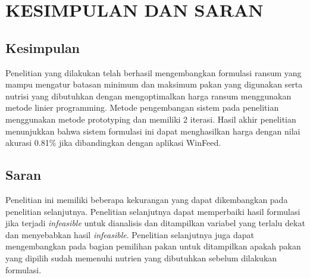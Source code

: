 \section*{KESIMPULAN DAN SARAN}
\subsection*{Kesimpulan}
Penelitian yang dilakukan telah berhasil mengembangkan formulasi ransum yang mampu mengatur batasan minimum dan maksimum pakan yang digunakan serta nutrisi yang dibutuhkan dengan mengoptimalkan harga ransum menggunakan metode linier programming. Metode pengembangan sistem pada penelitian menggunakan metode prototyping dan memiliki 2 iterasi. Hasil akhir penelitian menunjukkan bahwa sistem formulasi ini dapat menghasilkan harga dengan nilai akurasi 0.81\% jika dibandingkan dengan aplikasi WinFeed.

\subsection*{Saran}
Penelitian ini memiliki beberapa kekurangan yang dapat dikembangkan pada penelitian selanjutnya. Penelitian selanjutnya dapat memperbaiki hasil formulasi jika terjadi \textit{infeasible }untuk dianalisis dan ditampilkan variabel yang terlalu dekat dan menyebabkan hasil \textit{infeasible}. Penelitian selanjutnya juga dapat mengembangkan pada bagian pemilihan pakan untuk ditampilkan apakah pakan yang dipilih sudah memenuhi nutrien yang dibutuhkan sebelum dilakukan formulasi.